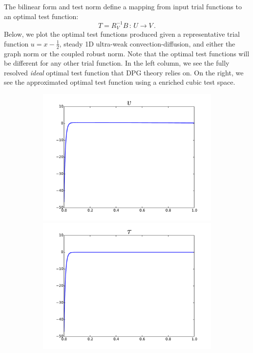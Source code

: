 \documentclass{article}
\begin{document}
The bilinear form and test norm define a mapping from input trial functions to an optimal test function:
\[
T=R_V^{-1}B\,:\,U\rightarrow V\,.
\]
Below, we plot the optimal test functions produced given a representative trial function $u=x-\frac{1}{2}$, steady 1D ultra-weak convection-diffusion, 
and either the graph norm or the coupled robust norm.
Note that the optimal test functions will be different for any other trial function.
In the left column, we see the fully resolved \emph{ideal} optimal test function that DPG theory relies on.
On the right, we see the approximated optimal test function using a enriched cubic test space.
\begin{figure}[ht]
\centering
\begin{subfigure}[t]{0.4\textwidth}
\centering
\includegraphics[width=\textwidth]{OptimalTestFunctions/Graph_v}\\
\includegraphics[width=\textwidth]{OptimalTestFunctions/Graph_tau}\\

\end{subfigure}
\end{figure}
\end{document}

